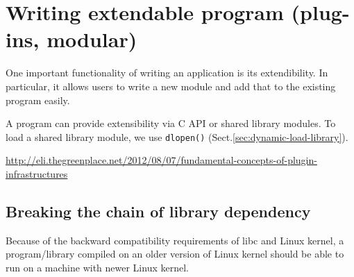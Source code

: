 \chapter{Writing extendable program (plug-ins, modular)}

One important functionality of writing an application is its extendibility. In
particular, it allows users to write a new module and add that to the existing
program easily.

A program can provide extensibility via C API or shared library modules.
To load a shared library module, we use \verb!dlopen()!
(Sect.\ref{sec:dynamic-load-library}).

\url{http://eli.thegreenplace.net/2012/08/07/fundamental-concepts-of-plugin-infrastructures}


\section{Breaking the chain of library dependency}

Because of the backward compatibility requirements of libc and Linux kernel, a
program/library compiled on an older version of Linux kernel should be able to
run on a machine with newer Linux kernel.

